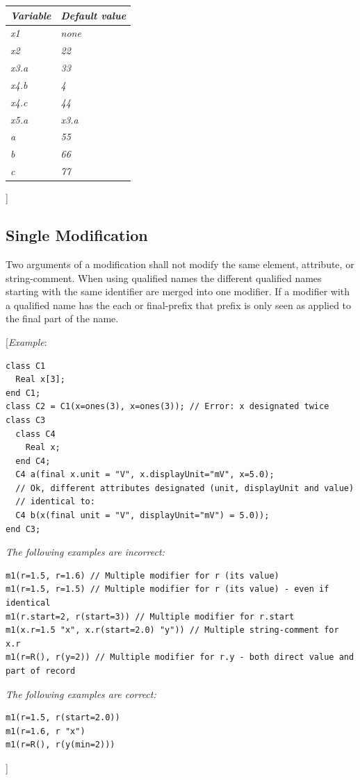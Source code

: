 \documentclass[10pt,a4paper]{report}
\def\doublelabel#1{\label{#1}\hypertarget{#1}{}}
\begin{document}
\begin{longtable}[]{|@{}l|l@{}|}
\hline
\emph{Variable} & \emph{Default value}\\ \hline
\emph{x1} & \emph{none}\\ \hline
\emph{x2} & \emph{22}\\ \hline
\emph{x3.a} & \emph{33}\\ \hline
\emph{x4.b} & \emph{4}\\ \hline
\emph{x4.c} & \emph{44}\\ \hline
\emph{x5.a} & \emph{x3.a}\\ \hline
\emph{a} & \emph{55}\\ \hline
\emph{b} & \emph{66}\\ \hline
\emph{c} & \emph{77}\\ \hline

\end{longtable}

{]}

\subsection{Single Modification}\doublelabel{single-modification}

Two arguments of a modification shall not modify the same element,
attribute, or string-comment. When using qualified names the different
qualified names starting with the same identifier are merged into one
modifier. If a modifier with a qualified name has the each or
final-prefix that prefix is only seen as applied to the final part of
the name.

{[}\emph{Example}:
\begin{lstlisting}[language=modelica]
class C1
  Real x[3];
end C1;
class C2 = C1(x=ones(3), x=ones(3)); // Error: x designated twice
class C3
  class C4
    Real x;
  end C4;
  C4 a(final x.unit = "V", x.displayUnit="mV", x=5.0);
  // Ok, different attributes designated (unit, displayUnit and value)
  // identical to:
  C4 b(x(final unit = "V", displayUnit="mV") = 5.0));
end C3;
\end{lstlisting}

\emph{The following examples are incorrect:}
\begin{lstlisting}[language=modelica]
m1(r=1.5, r=1.6) // Multiple modifier for r (its value)
m1(r=1.5, r=1.5) // Multiple modifier for r (its value) - even if identical
m1(r.start=2, r(start=3)) // Multiple modifier for r.start
m1(x.r=1.5 "x", x.r(start=2.0) "y")) // Multiple string-comment for x.r
m1(r=R(), r(y=2)) // Multiple modifier for r.y - both direct value and part of record
\end{lstlisting}
\emph{The following examples are correct:}
\begin{lstlisting}[language=modelica]
m1(r=1.5, r(start=2.0))
m1(r=1.6, r "x")
m1(r=R(), r(y(min=2)))
\end{lstlisting}
{]}
\end{document}
